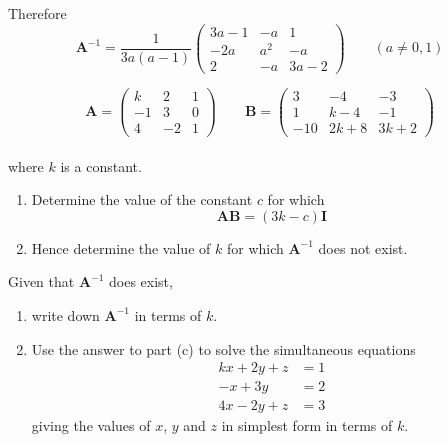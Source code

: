 \documentclass[leqno]{article}
\begin{document}
\begin{enumerate}[
  label=\textbf{\arabic*.},
  leftmargin=*,
  topsep=0pt,
  partopsep=0pt,
  parsep=0pt
]
\begin{djsSolution}
\begin{enumerate}[label=\textbf{(\alph*)}]
  Therefore
  \[
  \mathbf{A}^{-1}
  =\frac{1}{3a(a-1)}
  \begin{pmatrix}
  3a-1 & -a & 1\\
  -2a & a^2 & -a\\
  2 & -a & 3a-2
  \end{pmatrix}
  \qquad (a\neq 0,1)
  \]
\end{enumerate}
\end{djsSolution}


\newpage

\questionitem

\[
\mathbf{A} = \begin{pmatrix}
k & 2 & 1 \\
-1 & 3 & 0 \\
4 & -2 & 1
\end{pmatrix}
\qquad
\mathbf{B} = \begin{pmatrix}
3 & -4 & -3 \\
1 & k - 4 & -1 \\
-10 & 2k + 8 & 3k + 2
\end{pmatrix}
\] \\
where $k$ is a constant. \\

\begin{enumerate}[label=\textbf{(\alph*)}]
  \item Determine the value of the constant $c$ for which
  \[
  \mathbf{AB} = (3k - c)\mathbf{I}
  \]
  \item Hence determine the value of $k$ for which $\mathbf{A}^{-1}$ does not exist.  \\
\end{enumerate}

Given that $\mathbf{A}^{-1}$ does exist, \\

\begin{enumerate}[label=\textbf{(\alph*)}, resume]
  \item write down $\mathbf{A}^{-1}$ in terms of $k$.  \\
  \item Use the answer to part (c) to solve the simultaneous equations
  \[
  \begin{aligned}
  kx + 2y + z &= 1 \\
  -x + 3y &= 2 \\
  4x - 2y + z &= 3
  \end{aligned}
  \]
  giving the values of $x$, $y$ and $z$ in simplest form in terms of $k$.  \\
\end{enumerate}


\end{enumerate}
\end{document}
